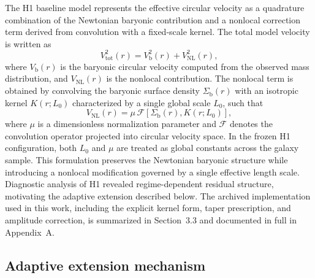 \documentclass{aa}
\begin{document}
The H1 baseline model represents the effective circular velocity as a 
quadrature combination of the Newtonian baryonic contribution and a 
nonlocal correction term derived from convolution with a fixed-scale 
kernel. The total model velocity is written as
\begin{equation}
	V_{\mathrm{tot}}^2(r) = V_{\mathrm{b}}^2(r) + V_{\mathrm{NL}}^2(r),
	\label{eq:vtot}
\end{equation}
where $V_{\mathrm{b}}(r)$ is the baryonic circular velocity computed 
from the observed mass distribution, and $V_{\mathrm{NL}}(r)$ is the 
nonlocal contribution. The nonlocal term is obtained by convolving the 
baryonic surface density $\Sigma_{\mathrm{b}}(r)$ with an isotropic 
kernel $K(r; L_0)$ characterized by a single global scale $L_0$, such that
\begin{equation}
	V_{\mathrm{NL}}(r) = \mu \, \mathcal{F}\left[\Sigma_{\mathrm{b}}(r), 
	K(r; L_0)\right],
	\label{eq:vnl}
\end{equation}
where $\mu$ is a dimensionless normalization parameter and $\mathcal{F}$ 
denotes the convolution operator projected into circular velocity space. 
In the frozen H1 configuration, both $L_0$ and $\mu$ are treated as global
constants across the galaxy sample. This formulation preserves the Newtonian
baryonic structure while introducing a nonlocal modification governed by a
single effective length scale. Diagnostic analysis of H1 revealed
regime-dependent residual structure, motivating the adaptive extension
described below. The archived implementation used in this work, including
the explicit kernel form, taper prescription, and amplitude correction,
is summarized in Section~3.3 and documented in full in Appendix~A.

\subsection{Adaptive extension mechanism}
\end{document}
